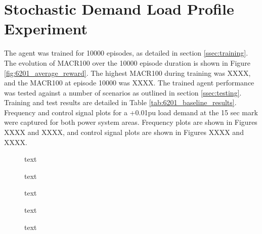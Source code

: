 \section{Stochastic Demand Load Profile Experiment}
The agent was trained for 10000 episodes, as detailed in section \ref{ssec:training}. The evolution of MACR100 over the 10000 episode duration is shown in Figure \ref{fig:6201_average_reward}. The highest MACR100 during training was XXXX, and the MACR100 at episode 10000 was XXXX. The trained agent performance was tested against a number of scenarios as outlined in section \ref{ssec:testing}. Training and test results are detailed in Table \ref{tab:6201_baseline_results}. Frequency and control signal plots for a +0.01pu load demand at the 15 sec mark were captured for both power system areas. Frequency plots are shown in Figures XXXX and XXXX, and control signal plots are shown in Figures XXXX and XXXX.

\vspace{2cm}

\begin{figure}[h]
	\centering
	
	\caption{text}
\end{figure}





\begin{figure}[h]
	\centering
	
	
	\caption{text}
	
	
	\caption{text}
	
	
	\caption{text}
			
	
	\caption{text}
\end{figure}